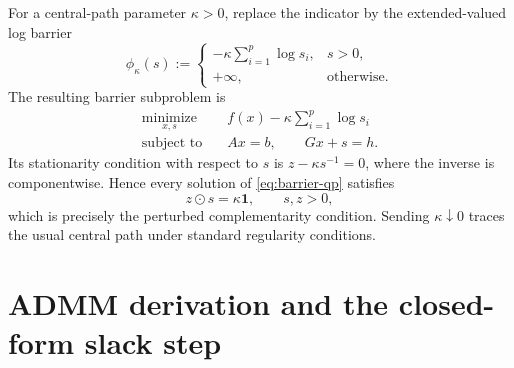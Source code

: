 \documentclass[9pt]{extarticle}
\newcommand{\ones}{\bm{1}}
\newcommand{\had}{\mathbin{\odot}}
\begin{document}
For a central-path parameter $\kappa>0$, replace the indicator by the extended-valued
log barrier
\begin{equation}
  \phi_\kappa(s):=
  \begin{cases}
     -\kappa\sum_{i=1}^p\log s_i,&s>0,\\
     +\infty,&\text{otherwise}.
  \end{cases}
\end{equation}
The resulting barrier subproblem is
\begin{equation}
\begin{aligned}
  \underset{x,s}{\operatorname{minimize}}\quad
     & f(x)-\kappa\sum_{i=1}^p\log s_i\\
  \operatorname{subject\ to}\quad
     & Ax=b,\qquad Gx+s=h.                         \label{eq:barrier-qp}
\end{aligned}
\end{equation}
Its stationarity condition with respect to $s$ is
$z-\kappa s^{-1}=0$, where the inverse is componentwise.  Hence every solution of
\eqref{eq:barrier-qp} satisfies
\begin{equation}
   z\had s=\kappa\ones,\qquad s,z>0,               \label{eq:central}
\end{equation}
which is precisely the perturbed complementarity condition.  Sending
$\kappa\downarrow0$ traces the usual central path under standard regularity
conditions.

\section{ADMM derivation and the closed-form slack step}
\end{document}

